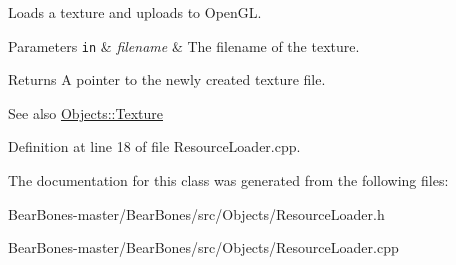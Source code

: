Loads a texture and uploads to Open\+GL. 
\begin{DoxyParams}[1]{Parameters}
\mbox{\tt in}  & {\em filename} & The filename of the texture. \\
\hline
\end{DoxyParams}
\begin{DoxyReturn}{Returns}
A pointer to the newly created texture file. 
\end{DoxyReturn}
\begin{DoxySeeAlso}{See also}
\hyperlink{class_objects_1_1_texture}{Objects\+::\+Texture} 
\end{DoxySeeAlso}


Definition at line 18 of file Resource\+Loader.\+cpp.



The documentation for this class was generated from the following files\+:\begin{DoxyCompactItemize}
\item 
Bear\+Bones-\/master/\+Bear\+Bones/src/\+Objects/Resource\+Loader.\+h\item 
Bear\+Bones-\/master/\+Bear\+Bones/src/\+Objects/Resource\+Loader.\+cpp\end{DoxyCompactItemize}
